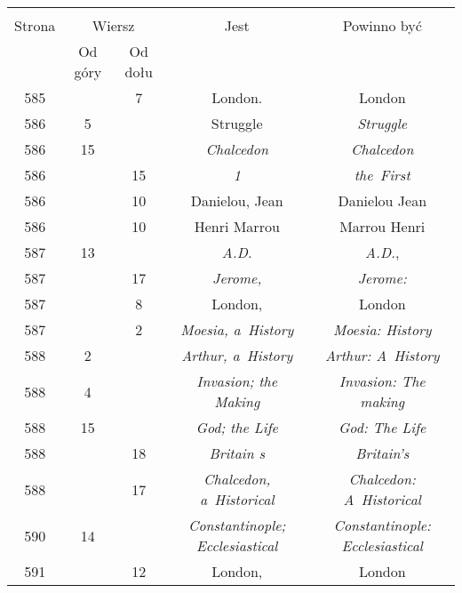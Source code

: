 \documentclass[a4paper,11pt]{article}
\begin{document}
\begin{center}
  \begin{tabular}{|c|c|c|c|c|}
    \hline
    & \multicolumn{2}{c|}{} & & \\
    Strona & \multicolumn{2}{c|}{Wiersz} & Jest
                              & Powinno być \\ \cline{2-3}
    & Od góry & Od dołu & & \\
    \hline
    585 & &  7 & London. & London \\
    586 &  5 & & Struggle & \emph{Struggle} \\
    586 & 15 & & \emph{Chalcedon} & \emph{Chalcedon} \\
    586 & & 15 & \emph{1} & \emph{the~First} \\
    586 & & 10 & Danielou, Jean & Danielou Jean \\
    586 & & 10 & Henri Marrou & Marrou Henri \\
    587 & 13 & & \emph{A.D.} & \emph{A.D.}, \\
    587 & & 17 & \emph{Jerome,} & \emph{Jerome:} \\
    587 & &  8 & London, & London \\
    587 & &  2 & \emph{Moesia, a~History} & \emph{Moesia: History} \\
    588 &  2 & & \emph{Arthur, a~History} & \emph{Arthur: A~History} \\
    588 &  4 & & \emph{Invasion; the Making}
           & \emph{Invasion: The making} \\
    588 & 15 & & \emph{God; the Life} & \emph{God: The Life} \\
    588 & & 18 & \emph{Britain s} & \emph{Britain's} \\
    588 & & 17 & \emph{Chalcedon, a~Historical}
           & \emph{Chalcedon: A~Historical} \\
    590 & 14 & & \emph{Constantinople; Ecclesiastical}
           & \emph{Constantinople: Ecclesiastical} \\
    591 & & 12 & London, & London \\

\end{tabular}
\end{center}
\end{document}
